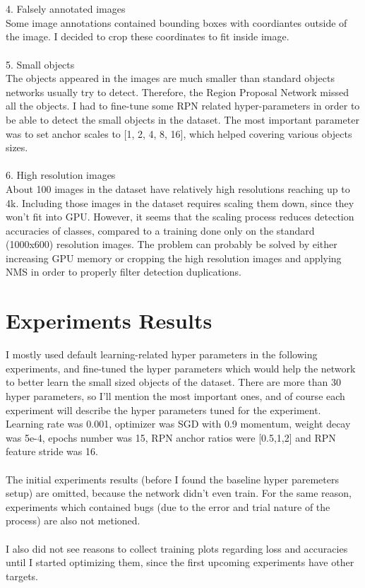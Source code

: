 \documentclass[]{article}
\begin{document}
\\\\
4. Falsely annotated images\\
Some image annotations contained bounding boxes with coordiantes outside of the image. I decided to crop these coordinates to fit inside image.
\\\\
5. Small objects\\
The objects appeared in the images are much smaller than standard objects networks usually try to detect. Therefore, the Region Proposal Network missed all the objects. I had to fine-tune some RPN related hyper-parameters in order to be able to detect the small objects in the dataset. The most important parameter was to set anchor scales to [1, 2, 4, 8, 16], which helped covering various objects sizes.
\\\\
6. High resolution images\\
About 100 images in the dataset have relatively high resolutions reaching up to 4k. Including those images in the dataset requires scaling them down, since they won't fit into GPU. However, it seems that the scaling process reduces detection accuracies of classes, compared to a training done only on the standard (1000x600) resolution images. The problem can probably be solved by either increasing GPU memory or cropping the high resolution images and applying NMS in order to properly filter detection duplications.

\section{Experiments Results}
I mostly used default learning-related hyper parameters in the following experiments, and fine-tuned the hyper parameters which would help the network to better learn the small sized objects of the dataset. There are more than 30 hyper parameters, so I'll mention the most important ones, and of course each experiment will describe the hyper parameters tuned for the experiment.\\
Learning rate was 0.001, optimizer was SGD with 0.9 momentum, weight decay was 5e-4, epochs number was 15, RPN anchor ratios were [0.5,1,2] and RPN feature stride was 16.
\\\\
The initial experiments results (before I found the baseline hyper paremeters setup) are omitted, because the network didn't even train. For the same reason, experiments which contained bugs (due to the error and trial nature of the process) are also not metioned.
\\\\
I also did not see reasons to collect training plots regarding loss and accuracies until I started optimizing them, since the first upcoming experiments have other targets.
\end{document}
